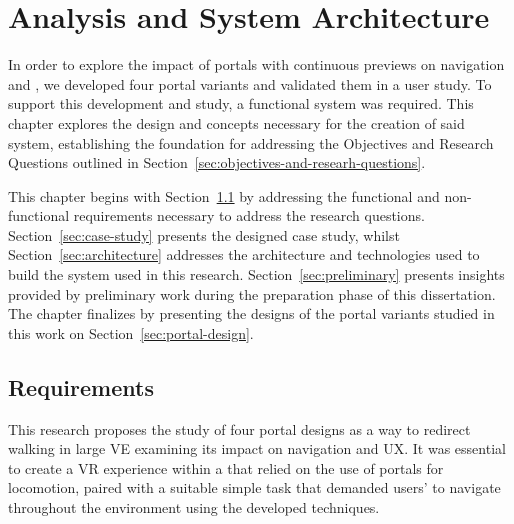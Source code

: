 
%

\makeatletter
\newcommand{\ntifpkgloaded}{%
  \@ifpackageloaded%
}
\makeatother


\chapter{Analysis and System Architecture}
\label{cha:analysis}

In order to explore the impact of portals with continuous previews on  navigation and , we developed four portal variants 
and validated them in a user study. To support this development and study, a functional system was required. This chapter explores the design and concepts 
necessary for the creation of said system, establishing the foundation for addressing the Objectives and Research Questions outlined in 
Section~\ref{sec:objectives-and-researh-questions}.

This chapter begins with Section~\ref{sec:requirements} by addressing the functional and non-functional requirements necessary to address the research questions.
Section~\ref{sec:case-study} presents the designed case study, whilst Section~\ref{sec:architecture} addresses the architecture and technologies used 
to build the system used in this research. Section~\ref{sec:preliminary} presents insights provided by preliminary work during the preparation phase of this dissertation.
The chapter finalizes by presenting the designs of the portal variants studied in this work on Section~\ref{sec:portal-design}.

\section{Requirements}
\label{sec:requirements}


This research proposes the study of four portal designs as a way to redirect walking in large \gls{VE} examining its impact on 
navigation and \gls{UX}. It was essential to create a \gls{VR} experience within a  that relied on the use of portals 
for locomotion, paired with a suitable simple task that demanded users' to navigate throughout the environment using the developed techniques.

